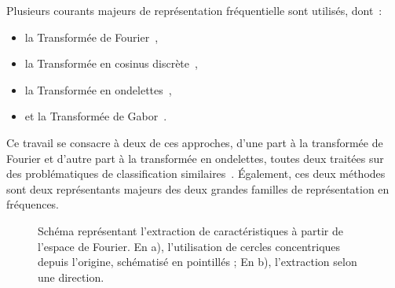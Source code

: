 Plusieurs courants majeurs de représentation fréquentielle sont utilisés, dont~: 
\begin{itemize}
    \item la Transformée de Fourier~\cite{Ursani2007, Smach2008a},
    \item la Transformée en cosinus discrète~\cite{Sorwar2001},
    \item la Transformée en ondelettes~\cite{Arivazhagan2003,Hong2010},
    \item et la Transformée de Gabor~\cite{Ursani2007}.
\end{itemize}
Ce travail se consacre à deux de ces approches, d'une part à la transformée de Fourier et d'autre part à la transformée en ondelettes, toutes deux traitées sur des problématiques de classification similaires~\cite{Wiltgen2008,Halimi2017a,Halimi2017b}. Également, ces deux méthodes sont deux représentants majeurs des deux grandes familles de représentation en fréquences.\par

\begin{figure}[h]
    \begin{center}
        \qquad
    \end{center}
    \caption{Schéma représentant l'extraction de caractéristiques à partir de l'espace de Fourier. En a), l'utilisation de cercles concentriques depuis l'origine, schématisé en pointillés ; En b), l'extraction selon une direction.}
    \label{fig:scheme_fourier_features}
\end{figure}\par

